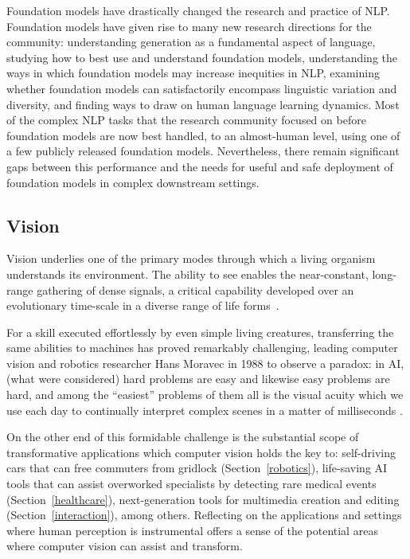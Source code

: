 Foundation models have drastically changed the research and practice of NLP\@. Foundation models have given rise to many new research directions for the community: understanding generation as a fundamental aspect of language, studying how to best use and understand foundation models, understanding the ways in which foundation models may increase inequities in NLP,  examining whether foundation models can satisfactorily encompass linguistic variation and diversity, and finding ways to draw on human language learning dynamics. Most of the complex NLP tasks that the research community focused on before foundation models are now best handled, to an almost-human level, using one of a few publicly released foundation models. Nevertheless, there remain significant gaps between this performance and the needs for useful and safe deployment of foundation models in complex downstream settings. 

\newsection
\subsection{Vision}
\label{sec:vision}

Vision underlies one of the primary modes through which a living organism understands its environment. The ability to see enables the near-constant, long-range gathering of dense signals, a critical capability developed over an evolutionary time-scale in a diverse range of life forms~\citep{parker2003blink,zhang21current}. 

For a skill executed effortlessly by even simple living creatures, transferring the same abilities to machines has proved remarkably challenging, leading computer vision and robotics researcher Hans Moravec in 1988 to observe a paradox: in AI, (what were considered) hard problems are easy and likewise easy problems are hard, and among the ``easiest'' problems of them all is the visual acuity which we use each day to continually interpret complex scenes in a matter of milliseconds \cite{moravec1988mind,Thorpe1996,feifei2007we}.

On the other end of this formidable challenge is the substantial scope of transformative applications which computer vision holds the key to: self-driving cars that can free commuters from gridlock (Section~\ref{robotics}), life-saving AI tools that can assist overworked specialists by detecting rare medical events (Section~\ref{healthcare}), next-generation tools for multimedia creation and editing (Section~\ref{interaction}), among others. Reflecting on the applications and settings where human perception is instrumental offers a sense of the potential areas where computer vision can assist and transform.

